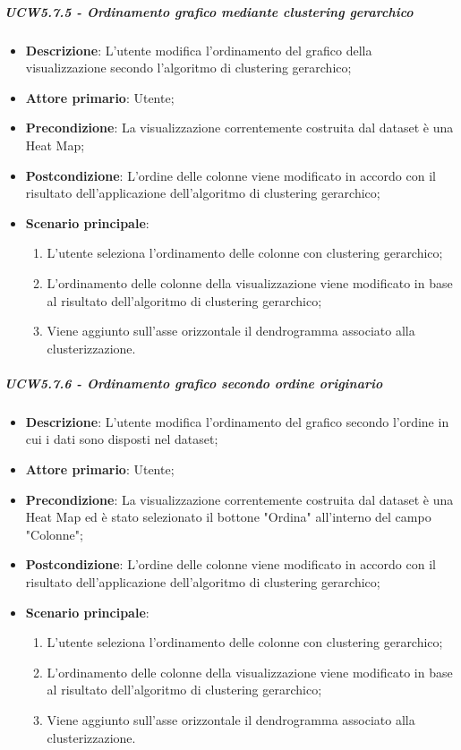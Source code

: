 \subparagraph{UCW5.7.5 - Ordinamento grafico mediante clustering gerarchico}
\label{spar:ucw5.7.5}
\begin{itemize}
    \item \textbf{Descrizione}:     L'utente modifica l'ordinamento del grafico  della visualizzazione secondo l'algoritmo di clustering gerarchico;
    \item \textbf{Attore primario}: Utente;
    \item \textbf{Precondizione}:   La visualizzazione correntemente costruita dal dataset è una Heat Map;
    \item \textbf{Postcondizione}:  L'ordine delle colonne viene modificato in accordo con il risultato dell'applicazione dell'algoritmo di clustering gerarchico;
    \item \textbf{Scenario principale}:
    \begin{enumerate}
        \item L'utente seleziona l'ordinamento delle colonne con clustering gerarchico;
        \item L'ordinamento delle colonne della visualizzazione viene modificato in base al risultato dell'algoritmo di clustering gerarchico;
        \item Viene aggiunto sull'asse orizzontale il dendrogramma associato alla clusterizzazione.
    \end{enumerate}
\end{itemize}

\subparagraph{UCW5.7.6 - Ordinamento grafico secondo ordine originario }
\label{spar:ucw5.7.6}
\begin{itemize}
    \item \textbf{Descrizione}:     L'utente modifica l'ordinamento del grafico secondo l'ordine in cui i dati sono disposti nel dataset;
    \item \textbf{Attore primario}: Utente;
    \item \textbf{Precondizione}:   La visualizzazione correntemente costruita dal dataset è una Heat Map ed è stato selezionato il bottone "Ordina" all'interno del campo "Colonne";
    \item \textbf{Postcondizione}:  L'ordine delle colonne viene modificato in accordo con il risultato dell'applicazione dell'algoritmo di clustering gerarchico;
    \item \textbf{Scenario principale}:
    \begin{enumerate}
        \item L'utente seleziona l'ordinamento delle colonne con clustering gerarchico;
        \item L'ordinamento delle colonne della visualizzazione viene modificato in base al risultato dell'algoritmo di clustering gerarchico;
        \item Viene aggiunto sull'asse orizzontale il dendrogramma associato alla clusterizzazione.
    \end{enumerate}
\end{itemize}



